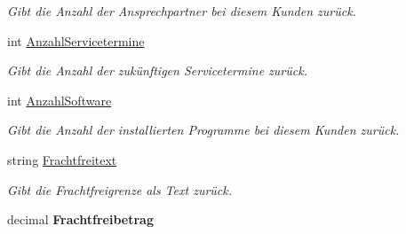 \begin{DoxyCompactItemize}
\begin{DoxyCompactList}\small\item\em Gibt die Anzahl der Ansprechpartner bei diesem Kunden zurück. \end{DoxyCompactList}\item 
int \hyperlink{class_products_1_1_model_1_1_entities_1_1_kunde_a1c6eafef85cdc0cff21c272ba1b80a0d}{Anzahl\+Servicetermine}
\begin{DoxyCompactList}\small\item\em Gibt die Anzahl der zukünftigen Servicetermine zurück. \end{DoxyCompactList}\item 
int \hyperlink{class_products_1_1_model_1_1_entities_1_1_kunde_af59d33e730a7082f6691e6530525ebc5}{Anzahl\+Software}
\begin{DoxyCompactList}\small\item\em Gibt die Anzahl der installierten Programme bei diesem Kunden zurück. \end{DoxyCompactList}\item 
string \hyperlink{class_products_1_1_model_1_1_entities_1_1_kunde_aa301dbde135e024b7222e0515e27d4ef}{Frachtfreitext}
\begin{DoxyCompactList}\small\item\em Gibt die Frachtfreigrenze als Text zurück. \end{DoxyCompactList}\item 
decimal {\bfseries Frachtfreibetrag}\hypertarget{class_products_1_1_model_1_1_entities_1_1_kunde_a4e02c8774ba5c53132a19bec6fffe472}{}\label{class_products_1_1_model_1_1_entities_1_1_kunde_a4e02c8774ba5c53132a19bec6fffe472}


\end{DoxyCompactItemize}

